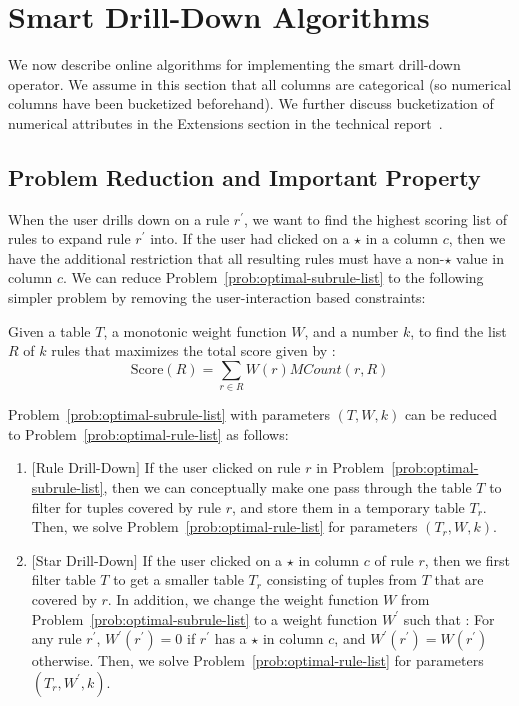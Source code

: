 

\section{Smart Drill-Down Algorithms} \label{sec:algorithms}
We now describe online algorithms for implementing
the smart drill-down operator. We assume in this section that all columns are categorical (so numerical columns have been bucketized beforehand). We further discuss bucketization of numerical attributes in the Extensions section in the technical report~\cite{tr}.


\subsection{Problem Reduction and Important Property} \label{sec:reduction}
When the user drills down on a rule $r^{\prime}$, we want to find the highest scoring list of rules to expand rule $r^{\prime}$ into. If the user had clicked on a $\star$ in a column $c$, then we have the additional restriction that all resulting rules must have a non-$\star$ value in column $c$. We can reduce Problem~\ref{prob:optimal-subrule-list} to the following simpler problem by removing the user-interaction based constraints: 

\begin{problem}\label{prob:optimal-rule-list}
Given a table $T$, a monotonic weight function $W$, and a number $k$, to find the list $R$ of $k$ rules that maximizes the total score given by :
$$\text{Score}(R) = \sum_{r \in R}W(r)MCount(r,R)$$
\end{problem}

\noindent Problem~\ref{prob:optimal-subrule-list} with parameters $(T, W, k)$ can be reduced to Problem~\ref{prob:optimal-rule-list} as follows:
\begin{enumerate}
\item $[$Rule Drill-Down$]$ If the user clicked on rule $r$ in Problem~\ref{prob:optimal-subrule-list}, then we can conceptually make one pass through the table $T$ to filter for tuples covered by rule $r$, and store them in a temporary table $T_r$. Then, we solve Problem~\ref{prob:optimal-rule-list} for parameters $(T_r, W, k)$.
\item $[$Star Drill-Down$]$ If the user clicked on a $\star$ in column $c$ of rule $r$, then we first filter table $T$ to get a smaller table $T_r$ consisting of tuples from $T$ that are covered by $r$. In addition, we change the weight function $W$ from Problem~\ref{prob:optimal-subrule-list} to a weight function $W^{\prime}$ such that : For any rule $r^{\prime}$, $W^{\prime}(r^{\prime}) = 0$ if $r^{\prime}$ has a $\star$ in column $c$, and $W^{\prime}(r^{\prime}) = W(r^{\prime})$ otherwise. Then, we solve Problem~\ref{prob:optimal-rule-list} for parameters $(T_r, W^{\prime}, k)$.
\end{enumerate}


